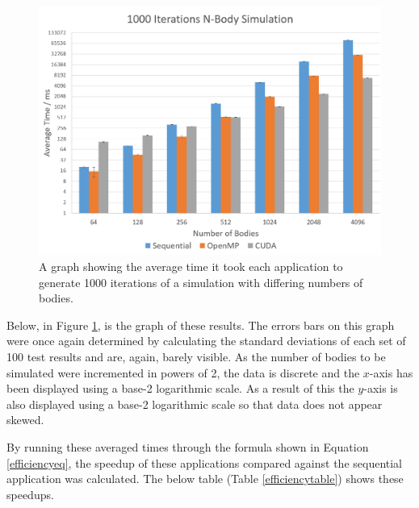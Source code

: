 \documentclass[12pt,journal,transmag]{IEEEtran}
\begin{document}
	\begin{figure}[!h]
		\centering
		\includegraphics[width=1.5\columnwidth]{IMAGES/perfcomp1}
		\caption{A graph showing the average time it took each application to generate 1000 iterations of a simulation with differing numbers of bodies.}
		\label{graph2}
	\end{figure}
	
	Below, in Figure \ref{graph2}, is the graph of these results. The errors bars on this graph were once again determined by calculating the standard deviations of each set of 100 test results and are, again, barely visible. As the number of bodies to be simulated were incremented in powers of 2, the data is discrete and the $x$-axis has been displayed using a base-2 logarithmic scale. As a result of this the $y$-axis is also displayed using a base-2 logarithmic scale so that data does not appear skewed.
	
	By running these averaged times through the formula shown in Equation \ref{efficiencyeq}, the speedup of these applications compared against the sequential application was calculated. The below table (Table \ref{efficiencytable}) shows these speedups.

	\begin{table}[!h]
		\caption{Algorithmic Efficiency Comparison}
		\label{efficiencytable}
		\centering
	\end{table}
\end{document}
